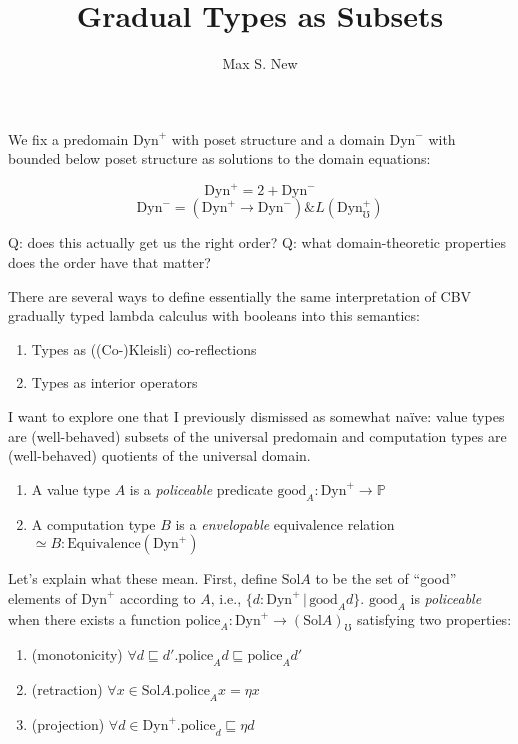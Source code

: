 \documentclass{article}
\newcommand{\dynv}{\text{Dyn}^+}
\newcommand{\dync}{\text{Dyn}^-}
\newcommand{\good}[1]{\text{good}_{#1}}
\newcommand{\prop}{\mathbb P}
\newcommand{\with}{\mathrel{\&}}
\newcommand{\eqv}{\simeq}
\newcommand{\soln}{\text{Sol}}
\newcommand{\police}[1]{\text{police}_{#1}}
\begin{document}
\title{Gradual Types as Subsets}
\author{Max S. New}

\maketitle

We fix a predomain $\dynv$ with poset structure and a domain $\dync$
with bounded below poset structure as solutions to the domain
equations:

\[ \dynv = 2 + \dync \]
\[ \dync = (\dynv \to \dync) \with L (\dynv_{\mho}) \]

Q: does this actually get us the right order?
Q: what domain-theoretic properties does the order have that matter?

There are several ways to define essentially the same interpretation
of CBV gradually typed lambda calculus with booleans into this
semantics:

\begin{enumerate}
\item Types as ((Co-)Kleisli) co-reflections
\item Types as interior operators
\end{enumerate}

I want to explore one that I previously dismissed as somewhat na\"ive:
value types are (well-behaved) subsets of the universal predomain and
computation types are (well-behaved) quotients of the universal
domain.

\begin{enumerate}
\item A value type $A$ is a \emph{policeable} predicate $\good A :
  \dynv \to \prop$
\item A computation type $B$ is a \emph{envelopable} equivalence
  relation $\eqv B : \text{Equivalence}(\dynv)$
\end{enumerate}

Let's explain what these mean.
%
First, define $\soln A$ to be the set of ``good'' elements of $\dynv$
according to $A$, i.e., $\{ d : \dynv \,|\, \good A d \}$.
%
$\good A$ is \emph{policeable} when there exists a function $\police A
: \dynv \to (\soln A)_\mho$ satisfying two properties:
\begin{enumerate}
\item (monotonicity) $\forall d \sqsubseteq d'. \police A d \sqsubseteq \police A d'$
\item (retraction) $\forall x \in \soln A. \police A x = \eta x$
\item (projection) $\forall d \in \dynv. \police d \sqsubseteq \eta d$
\end{enumerate}
\end{document}

